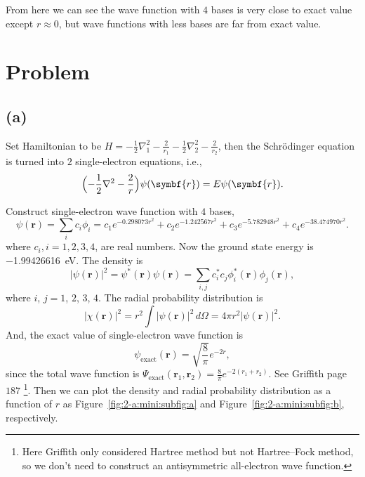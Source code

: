 \documentclass[12pt]{article}
\newcommand*{\RMN}[1]{\uppercase\expandafter{\romannumeral#1}}
\begin{document}
From here we can see the wave function with $4$ bases is very close to exact value except $r \approx 0$, but
wave functions with less bases are far from exact value.


\section{Problem \RMN{2}}

\subsection*{(a)}

Set Hamiltonian to be $H = -\frac{1}{2}\nabla_1^2 - \frac{2}{r_1} - \frac{1}{2}\nabla_2^2 - \frac{2}{r_2}$, then
the Schrödinger equation is turned into $2$ single-electron equations, i.e.,
%
\begin{equation}
    \Bigl(-\frac{1}{2}\nabla^2 - \frac{2}{r}\Bigr) \psi(\symbf{r}) = E \psi(\symbf{r}).
\end{equation}

Construct single-electron wave function with $4$ bases,
%
\begin{equation}
    \psi(\symbf{r}) = \sum_{i} c_i \phi_i = c_1 e^{- 0.298073 r^2} +
    c_2 e^{- 1.242567 r^2} + c_3 e^{- 5.782948 r^2} + c_4 e^{-38.474970 r^2}.
\end{equation}
%
where $c_i, i=1,2,3,4$, are real numbers.
Now the ground state energy is \SI{-1.99426616}{\electronvolt}. The density is
%
\begin{equation}\label{eq:density}
    \lvert \psi(\symbf{r}) \rvert^2 = \psi^\ast(\symbf{r}) \psi(\symbf{r}) =
    \sum_{i, j} c_i^\ast c_j \phi_i^\ast(\symbf{r}) \phi_j(\symbf{r}),
\end{equation}
%
where $i$, $j = 1$, $2$, $3$, $4$. The radial probability distribution is
%
\begin{equation}
    \lvert \chi(\symbf{r}) \rvert^2 = r^2\int \lvert \psi(\symbf{r}) \rvert^2
    \, d\Omega = 4\pi r^2 \lvert \psi(\symbf{r}) \rvert^2.
\end{equation}
%
And, the exact value of single-electron wave function is
%
\begin{equation}
    \psi_{\text{exact}}(\symbf{r}) = \sqrt{\frac{8}{\pi}} e^{-2 r}, %
\end{equation}
%
since the total wave function is $\Psi_{\text{exact}}(\symbf{r}_1, \symbf{r}_2) = \frac{8}{\pi} e^{-2(r_1 + r_2)}$.
See Griffith page $187$ \footnote{Here
    Griffith only considered Hartree method but not
    Hartree--Fock method, so we don't need to construct an
    antisymmetric all-electron wave function.}.
Then we can plot the density and radial probability distribution as a function of $r$
as Figure~\ref{fig:2-a:mini:subfig:a} and Figure~\ref{fig:2-a:mini:subfig:b}, respectively.
\end{document}
